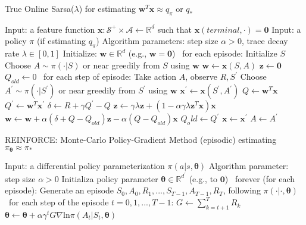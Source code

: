 \documentclass[12pt,a4paper]{article}
\begin{document}
\begin{algorithm}
\caption{True Online Sarsa($\lambda$) for estimating $\mathbf{w}^{T}\mathbf{x} \approx q_{\pi}$ or $q_{*}$}
\begin{algorithmic}
	\State Input: a feature function $\mathbf{x}: \mathcal{S}^{+} \times \mathcal{A} \leftarrow \mathbb{R}^{d} $ such that $\mathbf{x}(terminal, \cdot)=\mathbf{0}$
	\State Input: a policy $\pi$ (if estimating $q_{\pi}$)
	\State Algorithm parameters: step size $\alpha > 0$, trace decay rate $\lambda \in [0, 1]$
	\State Initialize: $\mathbf{w} \in \mathbb{R}^d$ (e.g., $\mathbf{w} = \mathbf{0}$)
	\State
	\Loop\ for each episode:
		\State Initialize $S$
		\State Choose $A \sim \pi(\cdot|S)$ or near greedily from $S$ using $\mathbf{w}$
		\State $\mathbf{w} \leftarrow \mathbf{x}(S,A)$
		\State $\mathbf{z} \leftarrow \mathbf{0}$
		\State $Q_{old} \leftarrow 0$
		\Repeat\ {for each step of episode}:
			\State Take action $A$, observe $R, S^{'}$
			\State Choose $A^{'} \sim \pi(\cdot|S^{'})$ or near greedily from $S^{'}$ using $\mathbf{w}$
			\State $\mathbf{x}^{'} \leftarrow \mathbf{x}(S^{'}, A^{'}) $
			\State $Q \leftarrow \mathbf{w}^{T}\mathbf{x}$
			\State $Q^{'} \leftarrow \mathbf{w}^{T}\mathbf{x}^{'}$
			\State $\delta \leftarrow R + \gamma Q^{'} - Q$
			\State $\mathbf{z} \leftarrow \gamma\lambda\mathbf{z} + (1 - \alpha\gamma\lambda\mathbf{z}^{T}\mathbf{x})\mathbf{x}$
			\State $\mathbf{w} \leftarrow \mathbf{w} + \alpha(\delta + Q - Q_{old})\mathbf{z} - \alpha(Q - Q_{old})\mathbf{x}$
			\State $Q_old \leftarrow Q^{'}$
			\State $\mathbf{x} \leftarrow \mathbf{x}^{'}$
			\State $A \leftarrow A^{'}$
	\EndLoop
\end{algorithmic}
\end{algorithm}

\newpage

\begin{algorithm}
\caption{REINFORCE: Monte-Carlo Policy-Gradient Method (episodic) estimating $\pi_{\bm{\theta}} \approx \pi_{*}$}
\begin{algorithmic}
	\State Input: a differential policy parameterization $\pi(a|s,\bm{\theta})$
	\State Algorithm parameter: step size $\alpha > 0$
	\State Initializa policy parameter $\bm{\theta} \in \mathbb{R}^{d^{'}}$ (e.g., to $\mathbf{0}$)
	\State
	\Loop\ forever (for each episode):
		\State Generate an episode $S_0, A_0, R_1, ..., S_{T-1}, A_{T-1}, R_T$, following $\pi(\cdot|\cdot,\bm{\theta})$
		\Loop\ for each step of the episode $t=0,1,...,T-1$:
			\State $G \leftarrow \sum_{k=t+1}^{T}R_{k}$
			\State $\bm{\theta} \leftarrow \bm{\theta} + \alpha\gamma^{t}G\nabla\text{ln}\pi(A_t|S_t,\bm{\theta})$		
		\EndLoop
	\EndLoop
\end{algorithmic}
\end{algorithm}
\end{document}
